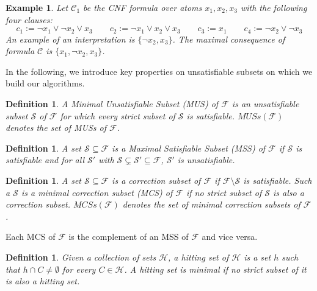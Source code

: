 \documentclass[twoside,11pt]{article}
\newcommand\m[1]{\mathcal{#1}}
\newtheorem{definition}[thm]{Definition}
\newtheorem{property}[prop]{Property}
\newtheorem{example}{Example}
\newcommand\comment[1]{\marginpar{\tiny #1}}
\renewcommand\comment[1]{#1}
\newcommand{\tias}[1]{{\comment{\color{blue}Tias:#1}}}
\newcommand{\bart}[1]{{\comment{\color{OliveGreen}Bart: #1}}}
\newcommand\F{\ensuremath{\m{F} }\xspace}
\newcommand\formula{\ensuremath{\m{F} }\xspace}
\newcommand\formulac{\ensuremath{\m{C} }\xspace}
\newcommand\muses[1]{\ensuremath{\mathit{MUSs}(#1)}\xspace}
\newcommand\mcses[1]{\ensuremath{\mathit{MCSs}(#1)}\xspace}
\begin{document}
\begin{example}\label{example:intro}
	Let $\formulac_1$ be the CNF formula over atoms $x_1, x_2, x_3$ with the following four clauses:
	\[ c_1 := \lnot x_1 \vee \lnot x_2 \vee x_3 \qquad  c_2 := \lnot x_1 \vee  x_2 \vee x_3 \qquad  c_3 := x_1 \qquad c_4 := \lnot x_2 \vee \lnot x_3 \]
	An example of an interpretation is $\{\lnot x_2, x_3\}$. The \emph{maximal consequence} of formula $\formulac$ is $\{x_1, \lnot x_2, x_3\}$.
\end{example}

In the following, we introduce key properties on unsatisfiable subsets on which we build our algorithms.

\begin{definition}
A \emph{Minimal Unsatisfiable Subset} (MUS) of 
\F is an unsatisfiable subset $\m{S}$ of $\F$ for which every strict subset of $\m{S} $ is satisfiable. 
\muses{\F} denotes the set of MUSs of \F. 
\end{definition}

\begin{definition}
A set $\m{S} \subseteq \formula$ is a \emph{Maximal Satisfiable Subset} (MSS) of $ \formula$ if $\m{S}$ is satisfiable and for all $\m{S}'$ with $\m{S}  \subsetneq  \m{S}'\subseteq\formula $, $\m{S}'$ is unsatisfiable.
\end{definition}

\begin{definition}
A set $\m{S} \subseteq \formula$ is a \emph{correction subset} of \formula if $\formula\setminus\m{S}$ is satisfiable. 
Such a $\m{S}$ is a \emph{minimal correction subset} (MCS)  of \formula if no strict subset of $\m{S}$ is also a correction subset. 
\mcses{\F} denotes the set of minimal correction subsets of \F. 
\end{definition}
Each  MCS of \formula is the complement of an MSS of \formula and vice versa. 	

\begin{definition}\label{def:minimal-hs}
Given a collection of sets $\m{H}$, a hitting set of $\m{H}$ is a set $h$ such that  $h \cap C \neq \emptyset$ for every $C \in \m{H}$. A hitting set is \emph{minimal} if no strict subset of it is also a hitting set.

\end{definition}
\end{document}

